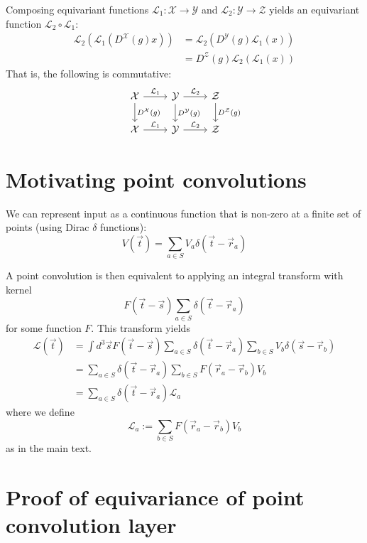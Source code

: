 \documentclass{article}
\begin{document}
Composing equivariant functions $\mathcal{L}_1 : \mathcal{X} \rightarrow \mathcal{Y}$ and $\mathcal{L}_2 : \mathcal{Y} \rightarrow \mathcal{Z}$ yields an equivariant function $\mathcal{L}_2 \circ \mathcal{L}_1$: 
\[
\begin{split}
\mathcal{L}_2(\mathcal{L}_1(D^\mathcal{X}(g) x)) &= \mathcal{L}_2(D^\mathcal{Y}(g)\mathcal{L}_1(x)) \\
&= D^\mathcal{Z}(g) \mathcal{L}_2(\mathcal{L}_1(x))
\end{split}
\]
That is, the following is commutative:
\[\begin{tikzcd}
\mathcal{X} \arrow[r, "\mathcal{L}_1"] \arrow[d, "D^\mathcal{X}(g)"] & \mathcal{Y} \arrow[r, "\mathcal{L}_2"] \arrow[d, "D^\mathcal{Y}(g)"] 
& \mathcal{Z} \arrow[d, "D^\mathcal{Z}(g)"] \\
\mathcal{X} \arrow[r, "\mathcal{L}_1"] & \mathcal{Y} \arrow[r, "\mathcal{L}_2"] & \mathcal{Z}
\end{tikzcd}\]

\section{Motivating point convolutions}

We can represent input as a continuous function that is non-zero at a finite set of points (using Dirac $\delta$ functions): \[V(\vec{t}) = \sum_{a \in S} V_a \delta(\vec{t} - \vec{r}_a)\]

A point convolution is then equivalent to applying an integral transform with kernel \[F(\vec{t} - \vec{s}) \sum_{a \in S} \delta(\vec{t} - \vec{r}_a)\] for some function $F$.
This transform yields
\begin{align*}\mathcal{L}(\vec{t}) &= \int d^3\vec{s} F(\vec{t} - \vec{s}) \sum_{a \in S} \delta(\vec{t} - \vec{r}_a) \sum_{b \in S} V_b \delta(\vec{s} - \vec{r}_b) \\
&= \sum_{a \in S} \delta(\vec{t} - \vec{r}_a)\sum_{b\in S} F(\vec{r}_a - \vec{r}_b) V_b \\
&= \sum_{a\in S} \delta(\vec{t} - \vec{r}_a)\mathcal{L}_a
\end{align*}
where we define
\[\mathcal{L}_a := \sum_{b\in S} F(\vec{r}_a - \vec{r}_b) V_b\]
as in the main text.

\section{Proof of equivariance of point convolution layer}
\label{sec:proof_point_conv}
\end{document}
